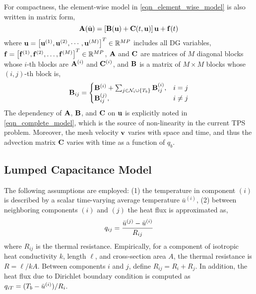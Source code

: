 For compactness, the element-wise model in \cref{eqn_element_wise_model} is also written in matrix form,
\begin{equation}
    \mathbf{A}(\dot{\mathbf{u}}) = \left[\mathbf{B}(\mathbf{u}) + \mathbf{C}(t,\mathbf{u})\right]\mathbf{u} + \mathbf{f}(t)\label{eqn_complete_model}
\end{equation}
where $\mathbf{u} = \left[\mathbf{u}^{(1)},\mathbf{u}^{(2)},\cdots,\mathbf{u}^{(M)}\right]^T\in\mathbb{R}^{MP}$ includes all DG variables, $\mathbf{f}=\left[\mathbf{f}^{(1)},\mathbf{f}^{(2)},\dots,\mathbf{f}^{(M)}\right]^T\in\mathbb{R}^{MP}$, $\mathbf{A}$ and $\mathbf{C}$ are matrices of $M$ diagonal blocks whose $i$-th blocks are $\mathbf{A}^{(i)}$ and $\mathbf{C}^{(i)}$, and $\mathbf{B}$ is a matrix of $M\times M$ blocks whose $(i,j)$-th block is,
\begin{equation}
    \mathbf{B}_{ij} = \begin{cases}
            \mathbf{B}^{(i)} + \sum_{j\in\mathcal{N}_i\cup\left\{T_b\right\}}\mathbf{B}^{(i)}_{ij}, & i=j\\
            \mathbf{B}^{(j)}_{ij}, & i\neq j
        \end{cases}
\end{equation}
The dependency of $\mathbf{A}$, $\mathbf{B}$, and $\mathbf{C}$ on $\mathbf{u}$ is explicitly noted in \cref{eqn_complete_model}, which is the source of non-linearity in the current TPS problem. Moreover, the mesh velocity $\mathbf{v}$ varies with space and time, and thus the advection matrix $\mathbf{C}$ varies with time as a function of $q_b$.

\subsection{Lumped Capacitance Model}

The following assumptions are employed: (1) the temperature in component $(i)$ is described by a scalar time-varying average temperature $\bar{u}^{(i)}$, (2) between neighboring components $(i)$ and $(j)$ the heat flux is approximated as,
\begin{equation}
    q_{ij} = \frac{\bar{u}^{(j)} - \bar{u}^{(i)}}{R_{ij}}
\end{equation}
where $R_{ij}$ is the thermal resistance. Empirically, for a component of isotropic heat conductivity $k$, length $\ell$, and cross-section area $A$, the thermal resistance is $R=\ell/kA$. Between components $i$ and $j$, define $R_{ij}=R_{i} + R_{j}$. In addition, the heat flux due to Dirichlet boundary condition is computed as $q_{iT} = (T_b - \bar{u}^{(i)})/R_{i}$.

